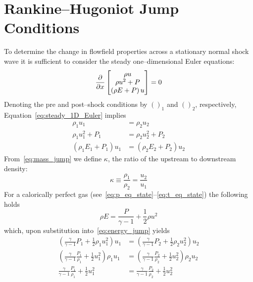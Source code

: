 \section{Rankine--Hugoniot Jump Conditions\label{rankine_hugoniot_jumps}}
To determine the change in flowfield properties across a stationary normal shock wave it is sufficient to consider the steady one--dimensional Euler equations:
\begin{equation}
  \label{eq:steady_1D_Euler}
  {\frac{\partial{}}{\partial{x}}}
  \begin{bmatrix}
    \rho u       \\
    \rho u^2 + P \\
    \left(\rho E + P \right)u
  \end{bmatrix}
  = 0
\end{equation}
Denoting the pre and post--shock conditions by $()_1$ and $()_2$, respectively, Equation~\eqref{eq:steady_1D_Euler} implies
\begin{align}
  \label{eq:mass_jump}
  \rho_1 u_1 &= \rho_2 u_2 \\
  \label{eq:mom_jump}
  \rho_1 u_1^2 + P_1 &= \rho_2 u_2^2 + P_2 \\
  \label{eq:energy_jump}
  \left(\rho_1 E_1 + P_1 \right)u_1 &= \left(\rho_2 E_2 + P_2 \right)u_2
\end{align}
From~\eqref{eq:mass_jump} we define $\kappa$, the ratio of the upstream to downstream density:
\begin{equation}
  \label{eq:kappa_def}
  \kappa \equiv \frac{\rho_1}{\rho_2} = \frac{u_2}{u_1}
\end{equation}
For a calorically perfect gas (see~\eqref{eq:p_eq_state}--\eqref{eq:t_eq_state}) the following holds
\begin{equation}
  \label{eq:rE_def}
  \rho E = \frac{P}{\gamma - 1} + \frac{1}{2} \rho u^2
\end{equation}
which, upon substitution into~\eqref{eq:energy_jump} yields
\begin{align}
  \nonumber
  \left(\frac{\gamma}{\gamma - 1}P_1 + \frac{1}{2} \rho_1 u_1^2\right)u_1 &=
  \left(\frac{\gamma}{\gamma - 1}P_2 + \frac{1}{2} \rho_2 u_2^2\right)u_2 \\
  \nonumber
  \left(\frac{\gamma}{\gamma - 1}\frac{P_1}{\rho_1} + \frac{1}{2} u_1^2\right) \rho_1 u_1 &=
  \left(\frac{\gamma}{\gamma - 1}\frac{P_2}{\rho_2} + \frac{1}{2} u_2^2\right) \rho_2 u_2 \\
  \label{eq:energy_jump_2}
  \frac{\gamma}{\gamma - 1}\frac{P_1}{\rho_1} + \frac{1}{2} u_1^2 &=
  \frac{\gamma}{\gamma - 1}\frac{P_2}{\rho_2} + \frac{1}{2} u_2^2 
\end{align}
